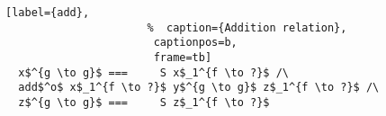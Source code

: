 \begin{figure}[!t]
  \centering
  \begin{minipage}{\columnwidth}
    \begin{lstlisting}[label={add},
                      %  caption={Addition relation},
                       captionpos=b,
                       frame=tb]
  x$^{g \to g}$ ===     S x$_1^{f \to ?}$ /\
  add$^o$ x$_1^{f \to ?}$ y$^{g \to g}$ z$_1^{f \to ?}$ /\
  z$^{g \to g}$ ===     S z$_1^{f \to ?}$
    \end{lstlisting}
  \end{minipage}
\end{figure}